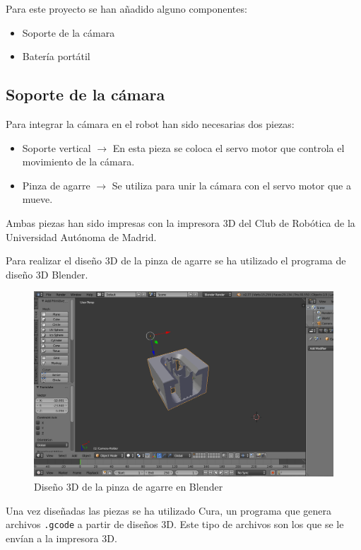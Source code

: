 \documentclass[twoside, 12pt]{epstfg}
\begin{document}
Para este proyecto se han añadido alguno componentes:

\begin{itemize}
	\item Soporte de la cámara
	\item Batería portátil
\end{itemize}

\subsection{Soporte de la cámara}

Para integrar la cámara en el robot han sido necesarias dos piezas:

\begin{itemize}
	\item Soporte vertical $\rightarrow$ En esta pieza se coloca el servo motor que controla el movimiento de la cámara.
	
	\item Pinza de agarre $\rightarrow$ Se utiliza para unir la cámara con el servo motor que a mueve.
\end{itemize}

Ambas piezas han sido impresas con la impresora 3D del Club de Robótica de la Universidad Autónoma de Madrid.

Para realizar el diseño 3D de la pinza de agarre se ha utilizado el programa de diseño 3D Blender.


\begin{figure}[h]
	\centerline{
		\mbox{\includegraphics[width=.80\textwidth]{images/cameraBlender.png}}
	}
	\caption{ Diseño 3D de la pinza de agarre en Blender}
\end{figure}

Una vez diseñadas las piezas se ha utilizado Cura, un programa que genera archivos \texttt{.gcode} a partir de diseños 3D. Este tipo de archivos son los que se le envían a la impresora 3D.
\end{document}
